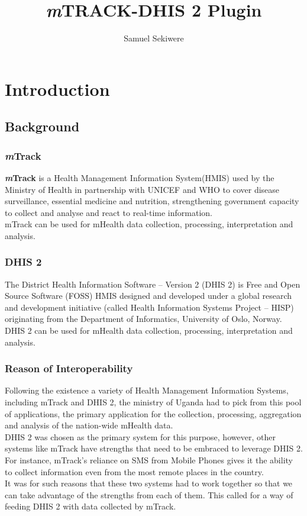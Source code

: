 \documentclass[11pt,a4paper]{article}
\title{\emph{m}TRACK-DHIS 2 Plugin}
\author{Samuel Sekiwere}
\begin{document}
\maketitle
\newpage
\tableofcontents
\newpage
\section{Introduction}
\label{Introduction}
\subsection{Background}
\subsubsection{\emph{m}Track}
\textbf{\emph{m}Track} is a Health Management Information System(HMIS) used by the Ministry of Health in partnership with UNICEF and WHO to cover disease surveillance, essential medicine and nutrition, strengthening government capacity to collect and analyse and react to real-time information.\\
mTrack can be used for mHealth data collection, processing, interpretation and analysis.
\subsubsection{DHIS 2}
The District Health Information Software – Version 2 (DHIS 2) is Free and Open Source Software (FOSS) HMIS
designed and developed under a global research and development initiative (called Health Information Systems Project
– HISP) originating from the Department of Informatics, University of Oslo, Norway.\\
DHIS 2 can be used for mHealth data collection, processing, interpretation and analysis.
\subsubsection{Reason of Interoperability}
Following the existence a variety of Health Management Information Systems, including mTrack and DHIS 2, the ministry of Uganda had to pick from this pool of applications, the primary application for the collection, processing, aggregation and analysis of the nation-wide mHealth data.\\
DHIS 2 was chosen as the primary system for this purpose, however, other systems like mTrack have strengths that need to be embraced to leverage DHIS 2. For instance, mTrack's reliance on SMS from Mobile Phones gives it the ability to collect information even from the most remote places in the country.\\
It was for such reasons that these two systems had to work together so that we can take advantage of the strengths from each of them.
This called for a way of feeding DHIS 2 with data collected by mTrack. 
\pagebreak
\end{document}
